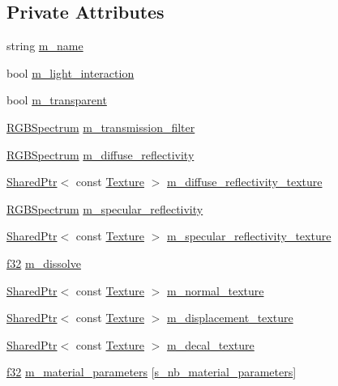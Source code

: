 \subsection*{Private Attributes}
\begin{DoxyCompactItemize}
\item 
string \hyperlink{structmage_1_1_material_a2b3e839a8ae093d53b12529d61ec6605}{m\+\_\+name}
\item 
bool \hyperlink{structmage_1_1_material_a636ddbd882e3ff2841c192c5ecbc5053}{m\+\_\+light\+\_\+interaction}
\item 
bool \hyperlink{structmage_1_1_material_abaaf4666e33f4a7952ef9d0801e3f199}{m\+\_\+transparent}
\item 
\hyperlink{structmage_1_1_r_g_b_spectrum}{R\+G\+B\+Spectrum} \hyperlink{structmage_1_1_material_a9573a0d2a5fb0322f9eb103ace34dd47}{m\+\_\+transmission\+\_\+filter}
\item 
\hyperlink{structmage_1_1_r_g_b_spectrum}{R\+G\+B\+Spectrum} \hyperlink{structmage_1_1_material_afd2cc813023698e52edc01b267a17e6c}{m\+\_\+diffuse\+\_\+reflectivity}
\item 
\hyperlink{namespacemage_a1e01ae66713838a7a67d30e44c67703e}{Shared\+Ptr}$<$ const \hyperlink{classmage_1_1_texture}{Texture} $>$ \hyperlink{structmage_1_1_material_a984d5671d151dfde08589daa0a3cd18e}{m\+\_\+diffuse\+\_\+reflectivity\+\_\+texture}
\item 
\hyperlink{structmage_1_1_r_g_b_spectrum}{R\+G\+B\+Spectrum} \hyperlink{structmage_1_1_material_a45587388f4ff57c209de2280b71af9d3}{m\+\_\+specular\+\_\+reflectivity}
\item 
\hyperlink{namespacemage_a1e01ae66713838a7a67d30e44c67703e}{Shared\+Ptr}$<$ const \hyperlink{classmage_1_1_texture}{Texture} $>$ \hyperlink{structmage_1_1_material_ad9ff13c552aaa97de98828cb15d16e18}{m\+\_\+specular\+\_\+reflectivity\+\_\+texture}
\item 
\hyperlink{namespacemage_a6a44ad388483959dc4dff9f2aef91431}{f32} \hyperlink{structmage_1_1_material_a1a667115cdec8f1f4caf116ba9295c91}{m\+\_\+dissolve}
\item 
\hyperlink{namespacemage_a1e01ae66713838a7a67d30e44c67703e}{Shared\+Ptr}$<$ const \hyperlink{classmage_1_1_texture}{Texture} $>$ \hyperlink{structmage_1_1_material_adc2d9d68524a55262bd0f4832880b10b}{m\+\_\+normal\+\_\+texture}
\item 
\hyperlink{namespacemage_a1e01ae66713838a7a67d30e44c67703e}{Shared\+Ptr}$<$ const \hyperlink{classmage_1_1_texture}{Texture} $>$ \hyperlink{structmage_1_1_material_aee546c25205a3b39ef6fdea3501f3edc}{m\+\_\+displacement\+\_\+texture}
\item 
\hyperlink{namespacemage_a1e01ae66713838a7a67d30e44c67703e}{Shared\+Ptr}$<$ const \hyperlink{classmage_1_1_texture}{Texture} $>$ \hyperlink{structmage_1_1_material_a5df6757f08aa50c83dc349698f9f7017}{m\+\_\+decal\+\_\+texture}
\item 
\hyperlink{namespacemage_a6a44ad388483959dc4dff9f2aef91431}{f32} \hyperlink{structmage_1_1_material_a4101aba9cbc86430efe6ed3bf48eeab1}{m\+\_\+material\+\_\+parameters} \mbox{[}\hyperlink{structmage_1_1_material_a06d6d7b7243ea8acce9445b501816d78}{s\+\_\+nb\+\_\+material\+\_\+parameters}\mbox{]}
\end{DoxyCompactItemize}


